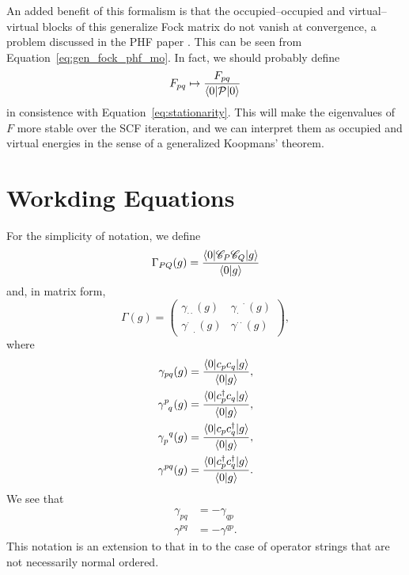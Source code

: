 \documentclass[11pt,letterpaper]{article}
\begin{document}
An added benefit of this formalism is that the occupied--occupied
and virtual--virtual blocks of this generalize Fock matrix do not vanish at convergence,
a problem discussed in the PHF paper \cite{Carlos2012PHF}.
This can be seen from Equation~\eqref{eq:gen_fock_phf_mo}.
In fact, we should probably define
\begin{equation}
  F_{pq} \mapsto
  \frac{F_{pq}}{\braket{0|\mathcal{P}|0}}
\end{equation}
in consistence with Equation~\eqref{eq:stationarity}.
This will make the eigenvalues of $F$ more stable over the SCF iteration,
and we can interpret them as occupied and virtual energies in the sense of
a generalized Koopmans' theorem.

\section{Workding Equations}%
\label{sec:WorkdingEquations}

For the simplicity of notation, we define
\begin{equation}
  \Gamma_{PQ}(g)
  = \frac{\braket{0|\mathscr{C}_P \mathscr{C}_Q|g}}{\braket{0|g}}
\end{equation}
and, in matrix form,
\begin{equation}
  \Gamma(g)
  = \begin{pmatrix}
    \gamma_{\cdot\cdot}(g) &
    \gamma_{\cdot\phantom{\cdot}}^{\phantom{\cdot}\cdot}(g) \\
    \gamma_{\phantom{\cdot}\cdot}^{\cdot\phantom{\cdot}}(g) &
    \gamma^{\cdot\cdot}(g)
  \end{pmatrix},
\end{equation}
where
\begin{subequations}
\begin{align}
  \gamma_{pq}(g)
  &= \frac{\braket{0|c_p c_q|g}}{\braket{0|g}},\\
  \gamma^{p\phantom{q}}_{\phantom{p}q}(g)
  &= \frac{\braket{0|c^\dag_p c_q|g}}{\braket{0|g}},\\
  \gamma^{\phantom{p}q}_{p\phantom{q}}(g)
  &= \frac{\braket{0|c_p c^\dag_q|g}}{\braket{0|g}},\\
  \gamma^{pq}(g)
  &= \frac{\braket{0|c^\dag_p c^\dag_q|g}}{\braket{0|g}}.
\end{align}
\end{subequations}
We see that
\begin{subequations}
\begin{align}
  \gamma_{pq} &= -\gamma_{qp}\\
  \gamma^{pq} &= -\gamma^{qp}.
\end{align}
\end{subequations}
This notation is an extension to that in \cite{Kutzelnigg1997} to the case of operator strings
that are not necessarily normal ordered.
\end{document}
